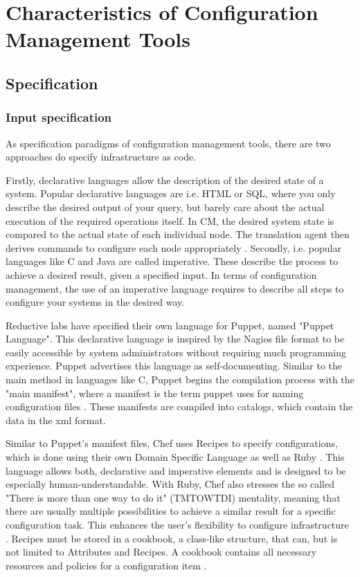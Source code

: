 \section{Characteristics of Configuration Management Tools}

\subsection{Specification}

\subsubsection{Input specification}

As specification paradigms of configuration management tools, there are two approaches do specify infrastructure as code. 

Firstly, declarative languages allow the description of the desired state of a system. Popular declarative languages are i.e. HTML or SQL, where you only describe the desired output of your query, but barely care about the actual execution of the required operations itself. In CM, the desired system state is compared to the actual state of each individual node. The translation agent then derives commands to configure each node appropriately \cite{delaet2010survey}. Secondly, i.e. popular languages like C and Java are called imperative. These describe the process to achieve a desired result, given a specified input. In terms of configuration management, the use of an imperative language requires to describe all steps to configure your systems in the desired way.

Reductive labs have specified their own language for Puppet, named "Puppet Language". This declarative language is inspired by the Nagios file format to be easily accessible by system administrators without requiring much programming experience. Puppet advertises this language  as self-documenting.
Similar to the main method in languages like C, Puppet begins the compilation process with the "main manifest", where a manifest is the term puppet uses for naming configuration files \cite{puppetcomlangsum}. These manifests are compiled into catalogs, which contain the data in the xml format.

Similar to Puppet's manifest files, Chef uses Recipes to specify configurations, which is done using their own Domain Specific Language as well as Ruby \cite{pandey2012investigating}. This language allows both, declarative and imperative elements and is designed to be especially human-understandable. With Ruby, Chef also stresses the so called "There is more than one way to do it" (TMTOWTDI) mentality, meaning that there are usually multiple possibilities to achieve a similar result for a specific configuration task. This enhances the user's flexibility to configure infrastructure \cite{https://docs.chef.io/recipes.html}. Recipes must be stored in a cookbook, a class-like structure, that can, but is not limited to Attributes and Recipes. A cookbook contains all necessary resources and policies for a configuration item \cite{chefiocookbooks}. 

